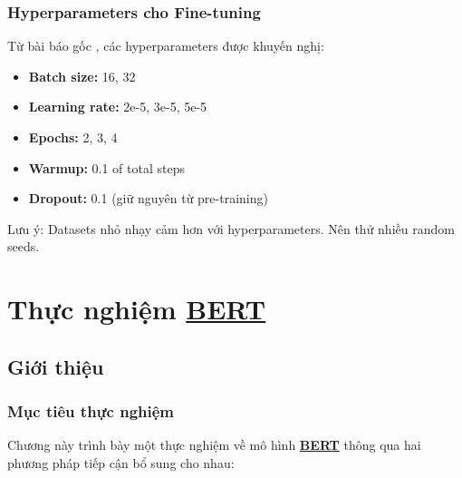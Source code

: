 \subsubsection{Hyperparameters cho Fine-tuning}
Từ bài báo gốc \cite{devlin2018bert}, các hyperparameters được khuyến nghị:
\begin{itemize}
    \item \textbf{Batch size:} 16, 32
    \item \textbf{Learning rate:} 2e-5, 3e-5, 5e-5 
    \item \textbf{Epochs:} 2, 3, 4
    \item \textbf{Warmup:} 0.1 of total steps
    \item \textbf{Dropout:} 0.1 (giữ nguyên từ pre-training)
\end{itemize}

Lưu ý: Datasets nhỏ nhạy cảm hơn với hyperparameters.
Nên thử nhiều random seeds.

\section{Thực nghiệm \hyperref[acro:bert]{\textbf{BERT}}}
\label{sec:thuc_nghiem_bert}

\subsection{Giới thiệu}
\label{ssec:gioi_thieu_dong_luc}

\subsubsection{Mục tiêu thực nghiệm}
Chương này trình bày một thực nghiệm về mô hình \hyperref[acro:bert]{\textbf{BERT}} thông qua hai phương pháp tiếp cận bổ sung cho nhau:


